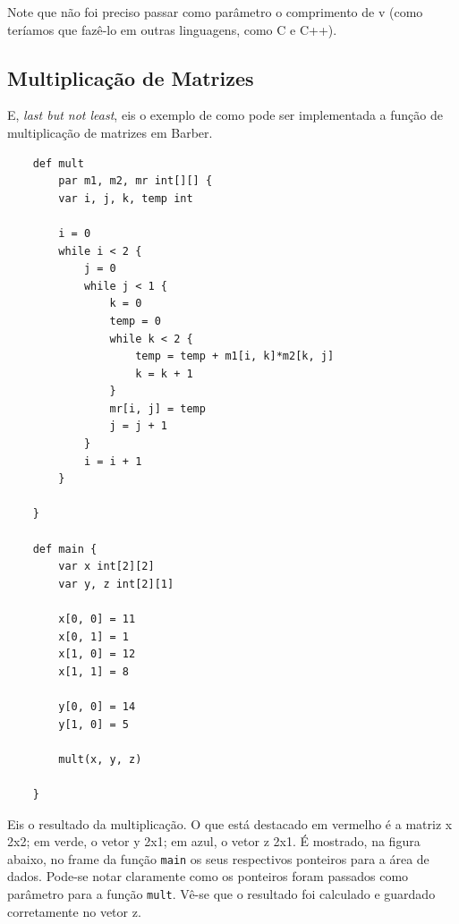 \documentclass[a4paper,12pt]{report}
\begin{document}
    Note que não foi preciso passar como parâmetro o comprimento de v (como teríamos que fazê-lo em outras linguagens, como C e C++).

    \newpage
    \subsection*{Multiplicação de Matrizes}
    E, \textit{last but not least}, eis o exemplo de como pode ser implementada a função de multiplicação de matrizes em Barber.

    \begin{lstlisting}
    def mult
        par m1, m2, mr int[][] {
        var i, j, k, temp int

        i = 0
        while i < 2 {
            j = 0
            while j < 1 {
                k = 0
                temp = 0
                while k < 2 {
                    temp = temp + m1[i, k]*m2[k, j]
                    k = k + 1
                }
                mr[i, j] = temp
                j = j + 1
            }
            i = i + 1
        }

    }

    def main {
        var x int[2][2]
        var y, z int[2][1]

        x[0, 0] = 11
        x[0, 1] = 1
        x[1, 0] = 12
        x[1, 1] = 8

        y[0, 0] = 14
        y[1, 0] = 5

        mult(x, y, z)

    }
    \end{lstlisting}

    Eis o resultado da multiplicação. O que está destacado em vermelho é a matriz x 2x2; em verde, o vetor y 2x1; em azul, o vetor z 2x1.
    É mostrado, na figura abaixo, no frame da função \verb|main| os seus respectivos ponteiros para a área de dados.
    Pode-se notar claramente como os ponteiros foram passados como parâmetro para a função \verb|mult|.
    Vê-se que o resultado foi calculado e guardado corretamente no vetor z.
\end{document}
